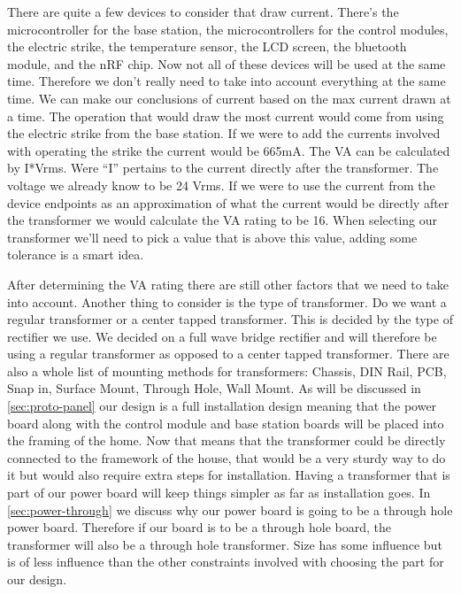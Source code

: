 There are quite a few devices to consider that draw current.
There{}'s the microcontroller for the base station, the microcontrollers for
the control modules, the electric strike, the temperature sensor, the LCD
screen, the bluetooth module, and the nRF chip. Now not all of these devices
will be used at the same time. Therefore we don{}'t really need to take into
account everything at the same time. We can make our conclusions of current
based on the max current drawn at a time. The operation that would draw the
most current would come from using the electric strike from the base station.
If we were to add the currents involved with operating the strike the current
would be 665mA. The VA can be calculated by I*Vrms. Were {}``I{}'' pertains
to the current directly after the transformer. The voltage we already know to
be 24 Vrms. If we were to use the current from the device endpoints as an
approximation of what the current would be directly after the transformer we
would calculate the VA rating to be 16. When selecting our transformer we{}'ll
need to pick a value that is above this value, adding some tolerance is a smart
idea.

After determining the VA rating there are still other factors
that we need to take into account. Another thing to consider is the type of
transformer. Do we want a regular transformer or a center tapped transformer.
This is decided by the type of rectifier we use. We decided on a full wave
bridge rectifier and will therefore be using a regular transformer as opposed
to a center tapped transformer. There are also a whole list of mounting
methods for transformers: Chassis, DIN Rail, PCB, Snap in, Surface Mount,
Through Hole, Wall Mount. As will be discussed in \autoref{sec:proto-panel} our
design is a full installation design meaning that the power board along with
the control module and base station boards will be placed into the framing of
the home. Now that means that the transformer could be directly connected to
the framework of the house, that would be a very sturdy way to do it but
would also require extra steps for installation. Having a transformer that is
part of our power board will keep things simpler as far as installation goes.
In \autoref{sec:power-through} we discuss why our power board is going to be a
through hole power board.  Therefore if our board is to be a through hole
board, the transformer will also be a through hole transformer. Size has some
influence but is of less influence than the other constraints involved with
choosing the part for our design.

